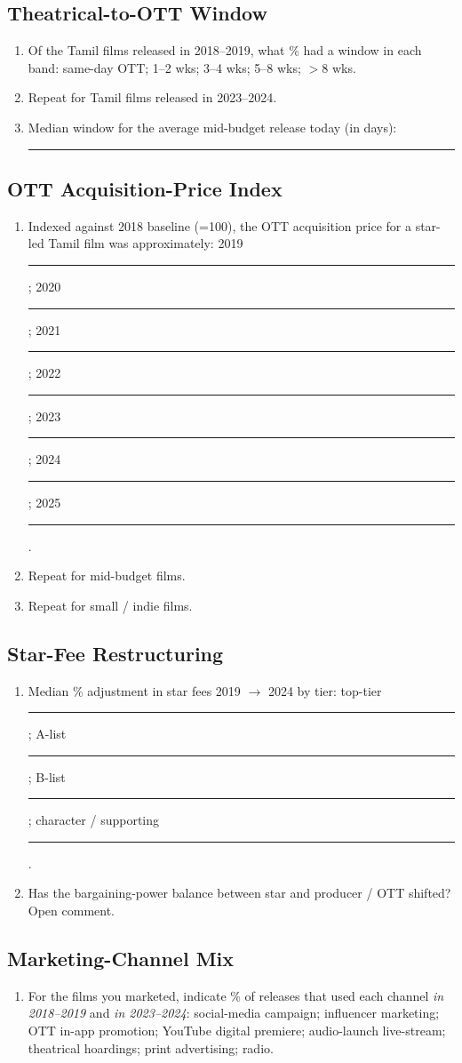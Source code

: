 \subsection*{Theatrical-to-OTT Window}
\begin{enumerate}[resume,itemsep=2pt]
  \item Of the Tamil films released in 2018--2019, what \% had a
        window in each band: same-day OTT; 1--2 wks; 3--4 wks;
        5--8 wks; $>$8 wks.
  \item Repeat for Tamil films released in 2023--2024.
  \item Median window for the average mid-budget release today
        (in days): \rule{2cm}{0.4pt}
\end{enumerate}

\subsection*{OTT Acquisition-Price Index}
\begin{enumerate}[resume,itemsep=2pt]
  \item Indexed against 2018 baseline (=100), the OTT acquisition
        price for a star-led Tamil film was approximately:
        2019 \rule{1cm}{0.4pt}; 2020 \rule{1cm}{0.4pt};
        2021 \rule{1cm}{0.4pt}; 2022 \rule{1cm}{0.4pt};
        2023 \rule{1cm}{0.4pt}; 2024 \rule{1cm}{0.4pt};
        2025 \rule{1cm}{0.4pt}.
  \item Repeat for mid-budget films.
  \item Repeat for small / indie films.
\end{enumerate}

\subsection*{Star-Fee Restructuring}
\begin{enumerate}[resume,itemsep=2pt]
  \item Median \% adjustment in star fees 2019 $\to$ 2024 by tier:
        top-tier \rule{1cm}{0.4pt}; A-list \rule{1cm}{0.4pt};
        B-list \rule{1cm}{0.4pt}; character / supporting
        \rule{1cm}{0.4pt}.
  \item Has the bargaining-power balance between star and
        producer / OTT shifted? Open comment.
\end{enumerate}

\subsection*{Marketing-Channel Mix}
\begin{enumerate}[resume,itemsep=2pt]
  \item For the films you marketed, indicate \% of releases that
        used each channel \emph{in 2018--2019} and \emph{in
        2023--2024}: social-media campaign; influencer marketing;
        OTT in-app promotion; YouTube digital premiere; audio-launch
        live-stream; theatrical hoardings; print advertising; radio.
\end{enumerate}

